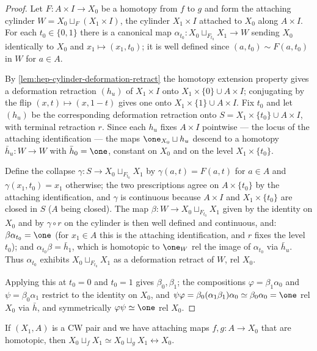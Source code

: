 \begin{proof}
\leanok
Let $F : A \times I \to X_0$ be a homotopy from $f$ to $g$ and form the attaching
cylinder $W = X_0 \sqcup_F (X_1 \times I)$, the cylinder $X_1 \times I$ attached to
$X_0$ along $A \times I$. For each $t_0 \in \{0,1\}$ there is a canonical map
$\alpha_{t_0} : X_0 \sqcup_{F_{t_0}} X_1 \to W$ sending $X_0$ identically to $X_0$ and
$x_1 \mapsto (x_1, t_0)$; it is well defined since $(a, t_0) \sim F(a,t_0)$ in $W$ for
$a \in A$.

By \cref{lem:hep-cylinder-deformation-retract} the homotopy extension property gives a
deformation retraction $(h_u)$ of $X_1 \times I$ onto $X_1 \times \{0\} \cup A \times I$;
conjugating by the flip $(x,t) \mapsto (x, 1-t)$ gives one onto
$X_1 \times \{1\} \cup A \times I$. Fix $t_0$ and let $(h_u)$ be the corresponding
deformation retraction onto $S = X_1 \times \{t_0\} \cup A \times I$, with terminal
retraction $r$. Since each $h_u$ fixes $A \times I$ pointwise — the locus of the
attaching identification — the maps $\one_{X_0} \sqcup h_u$ descend to a homotopy
$\bar h_u : W \to W$ with $\bar h_0 = \one$, constant on $X_0$ and on the level
$X_1 \times \{t_0\}$.

Define the collapse $\gamma : S \to X_0 \sqcup_{F_{t_0}} X_1$ by $\gamma(a, t) = F(a,t)$
for $a \in A$ and $\gamma(x_1, t_0) = x_1$ otherwise; the two prescriptions agree on
$A \times \{t_0\}$ by the attaching identification, and $\gamma$ is continuous because
$A \times I$ and $X_1 \times \{t_0\}$ are closed in $S$ ($A$ being closed). The map
$\beta : W \to X_0 \sqcup_{F_{t_0}} X_1$ given by the identity on $X_0$ and by
$\gamma \circ r$ on the cylinder is then well defined and continuous, and:
$\beta \alpha_{t_0} = \one$ (for $x_1 \in A$ this is the attaching identification, and
$r$ fixes the level $t_0$); and $\alpha_{t_0} \beta = \bar h_1$, which is homotopic to
$\one_W$ rel the image of $\alpha_{t_0}$ via $\bar h_u$. Thus $\alpha_{t_0}$ exhibits
$X_0 \sqcup_{F_{t_0}} X_1$ as a deformation retract of $W$, rel $X_0$.

Applying this at $t_0 = 0$ and $t_0 = 1$ gives $\beta_0, \beta_1$; the compositions
$\varphi = \beta_1 \alpha_0$ and $\psi = \beta_0 \alpha_1$ restrict to the identity on
$X_0$, and $\psi\varphi = \beta_0(\alpha_1\beta_1)\alpha_0 \simeq \beta_0\alpha_0 = \one$
rel $X_0$ via $\bar h$, and symmetrically $\varphi\psi \simeq \one$ rel $X_0$.
\end{proof}

\begin{proposition}
\label{prop:attaching-maps-homotopic-rel-x0}
If $(X_1,A)$ is a CW pair and we have attaching maps $f,g : A \to X_0$ that are
homotopic, then $X_0 \sqcup_f X_1 \simeq X_0 \sqcup_g X_1 \rel X_0$.
\end{proposition}

